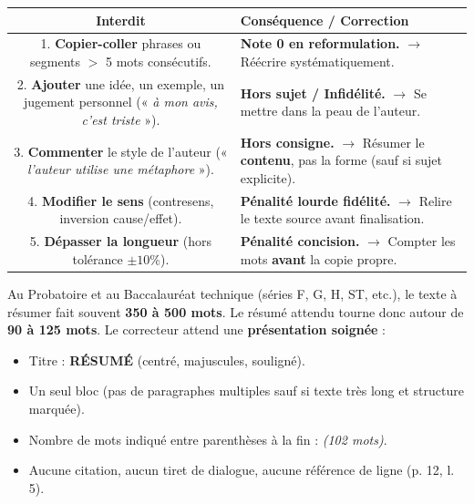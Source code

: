 \documentclass[11pt]{article}
\begin{document}
\begin{center}
\begin{tabular}{|c|p{12cm}|}\hline
\rowcolor{poporangeL}
\textbf{Interdit} & \textbf{Conséquence / Correction} \\ \hline
1. \textbf{Copier-coller} phrases ou segments $>$ 5 mots consécutifs. & \textbf{Note 0 en reformulation.} $\rightarrow$ Réécrire systématiquement. \\ \hline
2. \textbf{Ajouter} une idée, un exemple, un jugement personnel (« \textit{à mon avis, c'est triste} »). & \textbf{Hors sujet / Infidélité.} $\rightarrow$ Se mettre dans la peau de l'auteur. \\ \hline
3. \textbf{Commenter} le style de l'auteur (« \textit{l'auteur utilise une métaphore} »). & \textbf{Hors consigne.} $\rightarrow$ Résumer le \textbf{contenu}, pas la forme (sauf si sujet explicite). \\ \hline
4. \textbf{Modifier le sens} (contresens, inversion cause/effet). & \textbf{Pénalité lourde fidélité.} $\rightarrow$ Relire le texte source avant finalisation. \\ \hline
5. \textbf{Dépasser la longueur} (hors tolérance $\pm 10\%$). & \textbf{Pénalité concision.} $\rightarrow$ Compter les mots \textbf{avant} la copie propre. \\ \hline
\end{tabular}
\end{center}

\begin{savaistu}
Au Probatoire et au Baccalauréat technique (séries F, G, H, ST, etc.), le texte à résumer fait souvent \textbf{350 à 500 mots}. Le résumé attendu tourne donc autour de \textbf{90 à 125 mots}.
Le correcteur attend une \textbf{présentation soignée} :
\begin{itemize}
    \item Titre : \textbf{RÉSUMÉ} (centré, majuscules, souligné).
    \item Un seul bloc (pas de paragraphes multiples sauf si texte très long et structure marquée).
    \item Nombre de mots indiqué entre parenthèses à la fin : \textit{(102 mots)}.
    \item Aucune citation, aucun tiret de dialogue, aucune référence de ligne (p. 12, l. 5).
\end{itemize}
\end{savaistu}
\end{document}
